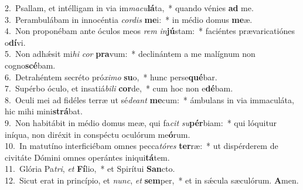 {2.~}Psallam, et intélligam in via im\textit{ma}\textit{cu}\textbf{lá}ta,~* quando vénies \textbf{ad} me.\\
{3.~}Perambulábam in innocéntia \textit{cor}\textit{dis} \textbf{me}i:~* in médio domus \textbf{me}æ.\\
{4.~}Non proponébam ante óculos meos \textit{rem} \textit{in}\textbf{jú}stam:~* faciéntes prævaricatiónes o\textbf{dí}vi.\\
{5.~}Non adhǽsit mi\textit{hi} \textit{cor} \textbf{pra}vum:~* declinántem a me malígnum non cogno\textbf{scé}bam.\\
{6.~}Detrahéntem secréto pró\textit{xi}\textit{mo} \textbf{su}o,~* hunc perse\textbf{qué}bar.\\
{7.~}Supérbo óculo, et insatiá\textit{bi}\textit{li} \textbf{cor}de,~* cum hoc non e\textbf{dé}bam.\\
{8.~}Oculi mei ad fidéles terræ ut sé\textit{de}\textit{ant} \textbf{me}cum:~* ámbulans in via immaculáta, hic mihi mini\textbf{strá}bat.\\
{9.~}Non habitábit in médio domus meæ, qui fa\textit{cit} \textit{su}\textbf{pér}biam:~* qui lóquitur iníqua, non diréxit in conspéctu oculórum me\textbf{ó}rum.\\
{10.~}In matutíno interficiébam omnes pecca\textit{tó}\textit{res} \textbf{ter}ræ:~* ut dispérderem de civitáte Dómini omnes operántes iniqui\textbf{tá}tem.\\
{11.~}Glória Pa\textit{tri}, \textit{et} \textbf{Fí}lio,~* et Spirítui \textbf{San}cto.\\
{12.~}Sicut erat in princípio, et \textit{nunc}, \textit{et} \textbf{sem}per,~* et in sǽcula sæculórum. \textbf{A}men.\\
